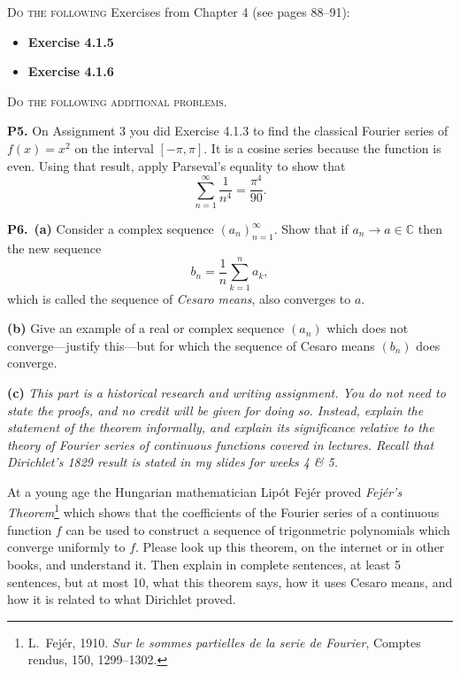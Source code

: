 \documentclass[12pt]{amsart}
\newcommand{\CC}{\mathbb{C}}
\newcommand{\prob}[1]{\bigskip\noindent\textbf{#1.}\quad }
\newcommand{\epart}[1]{\medskip\noindent\textbf{(#1)}\quad }
\newcommand{\ppart}[1]{\,\textbf{(#1)}\quad }
\begin{document}
\bigskip
\noindent \textsc{Do the following} Exercises from Chapter 4 (see pages 88--91):

\begin{itemize}
\item \textbf{Exercise 4.1.5}
\item \textbf{Exercise 4.1.6}
\end{itemize}


\medskip
\noindent \textsc{Do the following additional problems.}

\prob{P5}  On Assignment 3 you did Exercise 4.1.3 to find the classical Fourier series of $f(x)=x^2$ on the interval $[-\pi,\pi]$.  It is a cosine series because the function is even.  Using that result, apply Parseval's equality to show that
    $$\sum_{n=1}^\infty \frac{1}{n^4} = \frac{\pi^4}{90}.$$

\prob{P6}  \ppart{a} Consider a complex sequence $(a_n)_{n=1}^\infty$.  Show that if $a_n \to a \in \CC$ then the new sequence
	$$b_n = \frac{1}{n} \sum_{k=1}^n a_k,$$
which is called the sequence of \emph{Cesaro means}, also converges to $a$.

\epart{b}  Give an example of a real or complex sequence $(a_n)$ which does not converge---justify this---but for which the sequence of Cesaro means $(b_n)$ does converge.

\epart{c}  \emph{This part is a historical research and writing assignment.  You do not need to state the proofs, and no credit will be given for doing so.  Instead, explain the statement of the theorem informally, and explain its significance relative to the theory of Fourier series of continuous functions covered in lectures.  Recall that Dirichlet's 1829 result is stated in my slides for weeks 4 \& 5.}

\medskip \noindent At a young age the Hungarian mathematician Lip\'ot Fej\'er proved \emph{Fej\'er's Theorem}\footnote{L.~Fej\'er, 1910. \emph{Sur le sommes partielles de la serie de Fourier}, Comptes rendus, 150, 1299--1302.} which shows that the coefficients of the Fourier series of a continuous function $f$ can be used to construct a sequence of trigonmetric polynomials which converge uniformly to $f$.  Please look up this theorem, on the internet or in other books, and understand it.  Then explain in complete sentences, at least 5 sentences, but at most 10, what this theorem says, how it uses Cesaro means, and how it is related to what Dirichlet proved.
\end{document}
